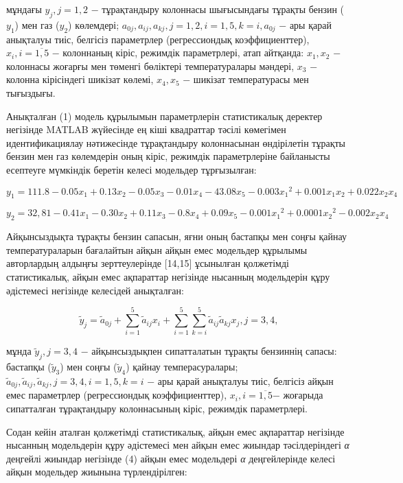 \begin{multicols}{2}
мұндағы $y_j, j=1,2$ − тұрақтандыру колоннасы шығысындағы тұрақты
бензин ($y_1$) мен газ ($y_2$) көлемдері; $a_{0j}, a_{ij}, a_{kj},
j=1,2, i=1,5, k=i, a_{0j}$ − ары қарай анықталуы тиіс, белгісіз
параметрлер (регрессиондық коэффициенттер), $x_i, i=\overline{1,5}$ −
колоннаның кіріс, режимдік параметрлері, атап айтқанда: $x_1, x_2$ −
колоннасы жоғарғы мен төменгі бөліктері температуралары мәндері, $
x_3$ − колонна кірісіндегі шикізат көлемі, $x_4,x_5$ − шикізат
температурасы мен тығыздығы.

Анықталған (1) модель құрылымын параметрлерін статистикалық деректер
негізінде MATLAB жүйесінде ең кіші квадраттар тәсілі көмегімен
идентификациялау нәтижесінде тұрақтандыру колоннасынан өндірілетін
тұрақты бензин мен газ көлемдерін оның кіріс, режимдік параметрлеріне
байланысты есептеуге мүмкіндік беретін келесі модельдер тұрғызылған:
\end{multicols}

\begin{equation}
y_1=111.8 - 0.05x_1 +0.13x_2 - 0.05x_3 - 0.01x_4 - 43.08x_5 - 0.003{x_1}^2 +0.001x_1x_2 +0.022x_2x_4 
\end{equation}

\begin{equation}
y_2 = 32,81 - 0.41x_1 - 0.30x_2 +0.11x_3 -0.8x_4 +0.09x_5 - 0.001{x_1}^2 +0.0001{x_2}^2	- 0.002{x_2x_4}
\end{equation}

\begin{multicols}{2}
Айқынсыздықта тұрақты бензин сапасын, яғни оның бастапқы мен соңғы
қайнау температураларын бағалайтын айқын айқын емес модельдер құрылымы
авторлардың алдыңғы зерттеулерінде {[}14,15{]} ұсынылған қолжетімді
статистикалық, айқын емес ақпараттар негізінде нысанның модельдерін құру
әдістемесі негізінде келесідей анықталған:
\end{multicols}

\begin{equation}
\tilde{y}_j=\tilde{a}_{0j}+\sum_{i=1}^5\tilde{a}_{ij}x_i+\sum_{i=1}^5\sum_{k=i}^5\tilde{a}_{ij}\tilde{a}_{kj}x_j,j=3,4,
\end{equation}

\begin{multicols}{2}
мұнда $\tilde{y}_j,j=3,4$ − айқынсыздықпен сипатталатын
тұрақты бензиннің сапасы: бастапқы ($\tilde{y}_3$)
мен соңғы ($\tilde{y}_4$) қайнау темперасуралары;
$\tilde{a}_{0j},\tilde{a}_{ij},\tilde{a}_{kj},j=3,4,i=1,5,k=i$
− ары қарай анықталуы тиіс, белгісіз
айқын емес параметрлер (регрессиондық коэффициенттер),
$x_i,i=\overline{1,5}$− жоғарыда сипатталған тұрақтандыру
колоннасының кіріс, режимдік параметрлері.

Содан кейін аталған қолжетімді статистикалық, айқын емес ақпараттар
негізінде нысанның модельдерін құру әдістемесі мен айқын емес жиындар
тәсілдеріндегі \emph{α} деңгейлі жиындар негізінде (4) айқын емес
модельдері \emph{α} деңгейлерінде келесі айқын модельдер жиынына
түрлендірілген:
\end{multicols}

